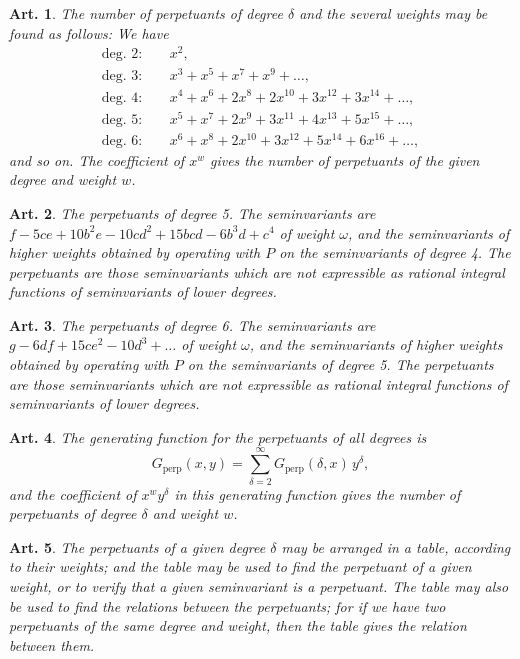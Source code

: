 \documentclass[11pt,a4paper]{article}
\theoremstyle{cayley}
\newtheorem{art}{Art.}[section]
\begin{document}
\setcounter{art}{59}
\begin{art}
The number of perpetuants of degree $\delta$ and the several weights may be found as follows: We have
\begin{align*}
\text{deg. } 2:\quad & x^{2},\\
\text{deg. } 3:\quad & x^{3} + x^{5} + x^{7} + x^{9} + \ldots,\\
\text{deg. } 4:\quad & x^{4} + x^{6} + 2x^{8} + 2x^{10} + 3x^{12} + 3x^{14} + \ldots,\\
\text{deg. } 5:\quad & x^{5} + x^{7} + 2x^{9} + 3x^{11} + 4x^{13} + 5x^{15} + \ldots,\\
\text{deg. } 6:\quad & x^{6} + x^{8} + 2x^{10} + 3x^{12} + 5x^{14} + 6x^{16} + \ldots,
\end{align*}
and so on. The coefficient of $x^{w}$ gives the number of perpetuants of the given degree and weight $w$.
\end{art}

\setcounter{art}{60}
\begin{art}
The perpetuants of degree 5. The seminvariants are $f - 5ce + 10b^{2}e - 10cd^{2} + 15bcd - 6b^{3}d + c^{4}$ of weight $\omega$, and the seminvariants of higher weights obtained by operating with $P$ on the seminvariants of degree 4. The perpetuants are those seminvariants which are not expressible as rational integral functions of seminvariants of lower degrees.
\end{art}

\setcounter{art}{61}
\begin{art}
The perpetuants of degree 6. The seminvariants are $g - 6df + 15ce^{2} - 10d^{3} + \ldots$ of weight $\omega$, and the seminvariants of higher weights obtained by operating with $P$ on the seminvariants of degree 5. The perpetuants are those seminvariants which are not expressible as rational integral functions of seminvariants of lower degrees.
\end{art}

\setcounter{art}{62}
\begin{art}
The generating function for the perpetuants of all degrees is
\[
G_{\text{perp}}(x, y) = \sum_{\delta=2}^{\infty} G_{\text{perp}}(\delta, x)\,y^{\delta},
\]
and the coefficient of $x^{w}y^{\delta}$ in this generating function gives the number of perpetuants of degree $\delta$ and weight $w$.
\end{art}

\setcounter{art}{63}
\begin{art}
The perpetuants of a given degree $\delta$ may be arranged in a table, according to their weights; and the table may be used to find the perpetuant of a given weight, or to verify that a given seminvariant is a perpetuant. The table may also be used to find the relations between the perpetuants; for if we have two perpetuants of the same degree and weight, then the table gives the relation between them.
\end{art}
\end{document}
